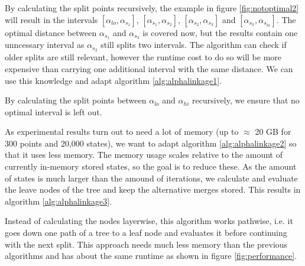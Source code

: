 By calculating the split points recursively, the example in figure \ref{fig:notoptimal2} will result in the intervals $[\alpha_{lo}, \alpha_{s_1}]$, $[\alpha_{s_1}, \alpha_{s_2}]$, $[\alpha_{s_2}, \alpha_{s_3}]$ and $[\alpha_{s_3}, \alpha_{s_{hi}}]$. The optimal distance between $\alpha_{s_1}$ and $\alpha_{s_3}$ is covered now, but the results contain one unncessary interval as $\alpha_{s_2}$ still splits two intervals. The algorithm can check if older splits are still relevant, however the runtime cost to do so will be more expensive than carrying one additional interval with the same distance. We can use this knowledge and adapt algorithm \ref{alg:alphalinkage1}.

\begin{algorithm}[H]
    \caption{By calculating the split points between $\alpha_{lo}$ and $\alpha_{hi}$ recursively, we ensure that no optimal interval is left out.}
    \label{alg:alphalinkage2}
\end{algorithm}

As experimental results turn out to need a lot of memory (up to $\approx$ 20 GB for 300 points and 20,000 states), we want to adapt algorithm \ref{alg:alphalinkage2} so that it uses less memory. The memory usage scales relative to the amount of currently in-memory stored states, so the goal is to reduce these. As the amount of states is much larger than the amound of iterations, we calculate and evaluate the leave nodes of the tree and keep the alternative merges stored. This results in algorithm \ref{alg:alphalinkage3}.

\begin{algorithm}[H]
    \caption{Instead of calculating the nodes layerwise, this algorithm works pathwise, i.e. it goes down one path of a tree to a leaf node and evaluates it before continuing with the next split. This approach needs much less memory than the previous algorithms and has about the same runtime as shown in figure \ref{fig:performance}.}
    \label{alg:alphalinkage3}
\end{algorithm}

